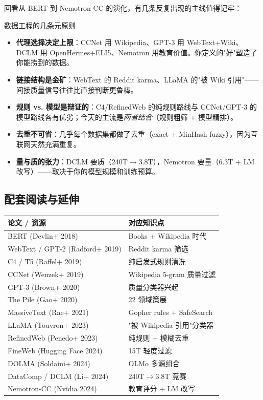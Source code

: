 \documentclass[a4paper]{article}
\begin{document}
回看从 BERT 到 Nemotron-CC 的演化，有几条反复出现的主线值得记牢：

\begin{knowledgebox}{数据工程的几条元原则}
\begin{itemize}
\item \textbf{代理选择决定上限}：CCNet 用 Wikipedia、GPT-3 用 WebText+Wiki、DCLM 用 OpenHermes+ELI5、Nemotron 用教育价值。你定义的"好"塑造了你能捞到的数据。
\item \textbf{链接结构是金矿}：WebText 的 Reddit karma、LLaMA 的"被 Wiki 引用"——间接质量信号往往比直接判断更鲁棒。
\item \textbf{规则 vs. 模型是辩证的}：C4/RefinedWeb 的纯规则路线与 CCNet/GPT-3 的模型路线各有优劣；今天的主流是\emph{两者结合}（规则粗筛 + 模型精排）。
\item \textbf{去重不可省}：几乎每个数据集都做了去重（exact + MinHash fuzzy），因为互联网天然充满重复。
\item \textbf{量与质的张力}：DCLM 要质（240T$\to$3.8T），Nemotron 要量（6.3T + LM 改写）——取决于你的模型规模和训练预算。
\end{itemize}
\end{knowledgebox}

\subsection{配套阅读与延伸}

\begin{tabular}{p{7cm}p{6cm}}
\toprule
\textbf{论文 / 资源} & \textbf{对应知识点} \\
\midrule
BERT (Devlin+ 2018) & Books + Wikipedia 时代 \\
WebText / GPT-2 (Radford+ 2019) & Reddit karma 筛选 \\
C4 / T5 (Raffel+ 2019) & 纯启发式规则清洗 \\
CCNet (Wenzek+ 2019) & Wikipedia 5-gram 质量过滤 \\
GPT-3 (Brown+ 2020) & 质量分类器兴起 \\
The Pile (Gao+ 2020) & 22 领域策展 \\
MassiveText (Rae+ 2021) & Gopher rules + SafeSearch \\
LLaMA (Touvron+ 2023) & "被 Wikipedia 引用"分类器 \\
RefinedWeb (Penedo+ 2023) & 纯规则 + 模糊去重 \\
FineWeb (Hugging Face 2024) & 15T 轻度过滤 \\
DOLMA (Soldaini+ 2024) & OLMo 多源组合 \\
DataComp / DCLM (Li+ 2024) & 240T$\to$3.8T 竞赛 \\
Nemotron-CC (Nvidia 2024) & 教育评分 + LM 改写 \\
\bottomrule
\end{tabular}

\end{document}

